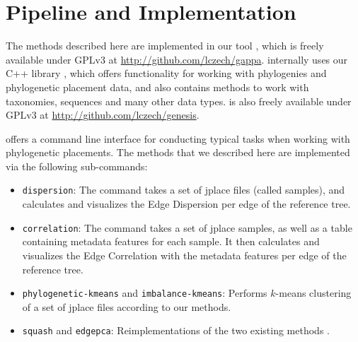 
\cleardoublepage

\chapter{Pipeline and Implementation}
\label{ch:PipelineImplementation}






The methods described here are implemented in our tool ,
which is freely available under GPLv3 at \url{http://github.com/lczech/gappa}.
 internally uses our C++ library ,
which offers functionality for working with phylogenies and phylogenetic placement data,
and also contains methods to work with taxonomies, sequences and many other data types.
 is also freely available under GPLv3 at \url{http://github.com/lczech/genesis}.

 offers a command line interface for conducting typical tasks when working with phylogenetic placements.
The methods that we described here are implemented via the following sub-commands:

\begin{itemize}
    \item \texttt{dispersion}: The command takes a set of jplace files (called samples), and calculates and visualizes
        the Edge Dispersion per edge of the reference tree.
    \item \texttt{correlation}: The command takes a set of jplace samples, as well as a table containing metadata
        features for each sample. It then calculates and visualizes the Edge Correlation with the metadata features per
        edge of the reference tree.
    \item \texttt{phylogenetic-kmeans} and \texttt{imbalance-kmeans}: Performs $k$-means clustering of a set of jplace
        files according to our methods.
    \item \texttt{squash} and \texttt{edgepca}: Reimplementations of the two existing methods \cite{Matsen2011a,Evans2012}.
\end{itemize}

